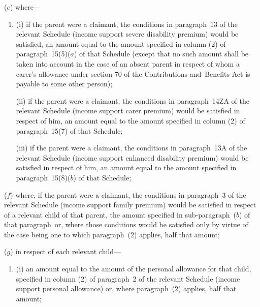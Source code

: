 \documentclass[12pt,a4paper]{article}
\begin{document}
\begin{enumerate}
($e$) where—
\begin{enumerate}\item[]
(i) if the parent were a claimant, the conditions in paragraph~13 of the relevant Schedule (income support severe disability premium) would be satisfied, an amount equal to the amount specified in column (2) of paragraph~15(5)($a$) of that Schedule (except that no such amount shall be taken into account in the case of an absent parent in respect of whom 
a carer’s allowance  %
under section 70 of the Contributions and~Benefits Act is payable to some other person);

(ii) if the parent were a claimant, the conditions in paragraph~14ZA of the relevant Schedule (income support carer premium) would be satisfied in respect of him, an amount equal to the amount specified in column (2) of paragraph~15(7) of that Schedule;

(iii) if the parent were a claimant, the conditions in paragraph~13A of the relevant Schedule (income support enhanced disability premium) would be satisfied in respect of him, an amount equal to the amount specified in paragraph~15(8)($b$)  of that Schedule;\end{enumerate}

($f$) where, if the parent were a claimant, the conditions in paragraph~3 of the relevant Schedule (income support family premium) would be satisfied in respect of a relevant child of that parent, 
the amount specified in 
sub-paragraph~($b$) of  %
that paragraph~or, where those conditions would be satisfied only by virtue of the case being one to which paragraph~(2) applies, half that amount;

($g$) in respect of each relevant child—
\begin{enumerate}\item[]
(i) an amount equal to the amount of the personal allowance for that child, specified in column (2) of paragraph~2 of the relevant Schedule (income support personal allowance) or, where paragraph~(2) applies, half that amount;


\end{enumerate}
\end{enumerate}
\end{document}
